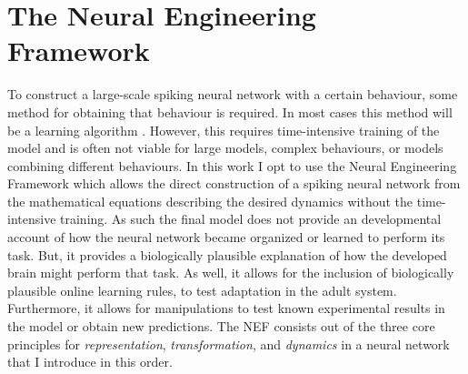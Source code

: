 \chapter{The Neural Engineering Framework}\label{sec:nef}

To construct a large-scale spiking neural network with a certain behaviour, some method for obtaining that behaviour is required.
In most cases this method will be a learning algorithm \parencite[e.g.,][]{oreilly2006}.
However, this requires time-intensive training of the model and is often not viable for large models, complex behaviours, or models combining different behaviours.
In this work I opt to use the Neural Engineering Framework \parencite[NEF;][]{eliasmith2003} which allows the direct construction of a spiking neural network from the mathematical equations describing the desired dynamics without the time-intensive training.
As such the final model does not provide an developmental account of how the neural network became organized or learned to perform its task.
But, it provides a biologically plausible explanation of how the developed brain might perform that task.
As well, it allows for the inclusion of biologically plausible online learning rules, to test adaptation in the adult system.
Furthermore, it allows for manipulations to test known experimental results in the model or obtain new predictions.
The NEF consists out of the three core principles for \emph{representation}, \emph{transformation}, and \emph{dynamics} in a neural network that I introduce in this order.

